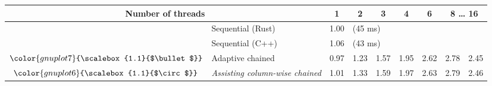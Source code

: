 \begin{tabular}{clrrrrrrr}
\toprule
\multicolumn{2}{c}{\textbf{Number of threads}} & \multicolumn{1}{c}{\textbf{ 1 }} & \multicolumn{1}{c}{\textbf{ 2 }} & \multicolumn{1}{c}{\textbf{ 3 }} & \multicolumn{1}{c}{\textbf{ 4 }} & \multicolumn{1}{c}{\textbf{ 6 }} & \multicolumn{2}{c}{\textbf{ 8 } \dots \textbf{ 16 }} \\
\midrule
& Sequential (Rust) & \multicolumn{1}{r}{ 1.00 } & \multicolumn{ 6 }{l}{(45 ms)} \\
& Sequential (C++) & \multicolumn{1}{r}{ 1.06 } & \multicolumn{ 6 }{l}{(43 ms)} \\
\rowcolor{gnuplot7!10}$\color{gnuplot7}{\scalebox{1.1}{$\bullet$}}$ & Adaptive chained & \cellcolor{gnuplot7!10} 0.97 & \cellcolor{gnuplot7!10} 1.23 & \cellcolor{gnuplot7!10} 1.57 & \cellcolor{gnuplot7!10} 1.95 & \cellcolor{gnuplot7!10} 2.62 & \cellcolor{gnuplot7!10} 2.78 & \cellcolor{gnuplot7!10} 2.45 \\
\rowcolor{gnuplot6!30}$\color{gnuplot6}{\scalebox{1.1}{$\circ$}}$ & \textit{Assisting column-wise chained} & \cellcolor{gnuplot6!30} 1.01 & \cellcolor{gnuplot6!30} 1.33 & \cellcolor{gnuplot6!30} 1.59 & \cellcolor{gnuplot6!30} 1.97 & \cellcolor{gnuplot6!30} 2.63 & \cellcolor{gnuplot6!30} 2.79 & \cellcolor{gnuplot6!30} 2.46 \\
\bottomrule
\end{tabular}
